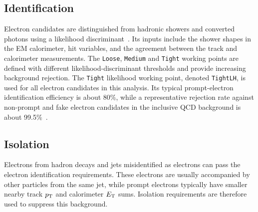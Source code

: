 \subsection{Identification}

Electron candidates are distinguished from hadronic showers and converted photons using a likelihood discriminant~\cite{ATLAS2019ElectronReco}.
Its inputs include the shower shapes in the EM calorimeter, hit variables, and the agreement between the track and calorimeter measurements.
The \texttt{Loose}, \texttt{Medium} and \texttt{Tight} working points are defined with different likelihood-discriminant thresholds and provide increasing background rejection.
The \texttt{Tight} likelihood working point, denoted \texttt{TightLH}, is used for all electron candidates in this analysis.
Its typical prompt-electron identification efficiency is about 80\%, while a representative rejection rate against non-prompt and fake electron candidates in the inclusive QCD background is about 99.5\%~\cite{ATLAS2024ElectronPhotonEfficiencies}.

\subsection{Isolation}

Electrons from hadron decays and jets misidentified as electrons can pass the electron identification requirements.
These electrons are usually accompanied by other particles from the same jet, while prompt electrons typically have smaller nearby track $p_{\mathrm{T}}$ and calorimeter $E_{\mathrm{T}}$ sums.
Isolation requirements are therefore used to suppress this background.

